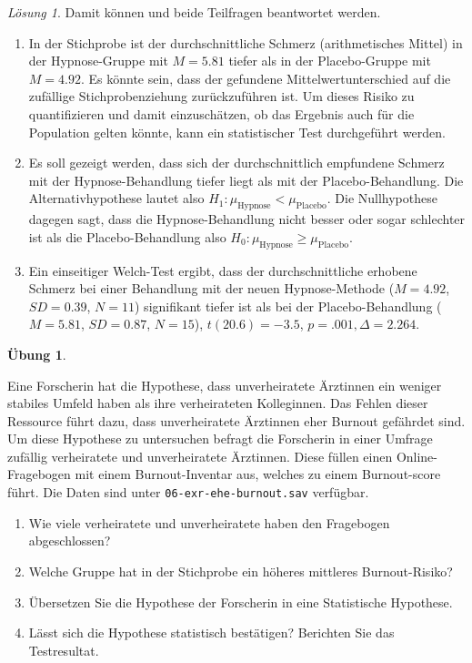 \documentclass[
]{book}
\providecommand{\tightlist}{%
  \setlength{\itemsep}{0pt}\setlength{\parskip}{0pt}}
\theoremstyle{definition}
\theoremstyle{definition}
\theoremstyle{definition}
\newtheorem{exercise}{Übung}[chapter]
\theoremstyle{definition}
\theoremstyle{remark}
\newtheorem*{solution}{Lösung}
\begin{document}
\begin{solution}
Damit können und beide Teilfragen beantwortet werden.

\begin{enumerate}
\def\labelenumi{\alph{enumi})}
\tightlist
\item
  In der Stichprobe ist der durchschnittliche Schmerz (arithmetisches Mittel) in der Hypnose-Gruppe mit \(M = 5.81\) tiefer als in der Placebo-Gruppe mit \(M = 4.92\). Es könnte sein, dass der gefundene Mittelwertunterschied auf die zufällige Stichprobenziehung zurückzuführen ist. Um dieses Risiko zu quantifizieren und damit einzuschätzen, ob das Ergebnis auch für die Population gelten könnte, kann ein statistischer Test durchgeführt werden.
\item
  Es soll gezeigt werden, dass sich der durchschnittlich empfundene Schmerz mit der Hypnose-Behandlung tiefer liegt als mit der Placebo-Behandlung. Die Alternativhypothese lautet also \(H_1: \mu_\text{Hypnose} < \mu_\text{Placebo}\). Die Nullhypothese dagegen sagt, dass die Hypnose-Behandlung nicht besser oder sogar schlechter ist als die Placebo-Behandlung also \(H_0: \mu_\text{Hypnose} \geq \mu_\text{Placebo}\).
\item
  Ein einseitiger Welch-Test ergibt, dass der durchschnittliche erhobene Schmerz bei einer Behandlung mit der neuen Hypnose-Methode (\(M = 4.92\), \(SD = 0.39\), \(N = 11\)) signifikant tiefer ist als bei der Placebo-Behandlung (\(M = 5.81\), \(SD = 0.87\), \(N = 15\)), \(t(20.6) = -3.5\), \(p = .001, \Delta = 2.264\).
\end{enumerate}

\end{solution}

\begin{exercise}
\protect\hypertarget{exr:ehe-burnout}{}\label{exr:ehe-burnout}\leavevmode

Eine Forscherin hat die Hypothese, dass unverheiratete Ärztinnen ein weniger stabiles Umfeld haben als ihre verheirateten Kolleginnen. Das Fehlen dieser Ressource führt dazu, dass unverheiratete Ärztinnen eher Burnout gefährdet sind. Um diese Hypothese zu untersuchen befragt die Forscherin in einer Umfrage zufällig verheiratete und unverheiratete Ärztinnen. Diese füllen einen Online-Fragebogen mit einem Burnout-Inventar aus, welches zu einem Burnout-score führt. Die Daten sind unter \texttt{06-exr-ehe-burnout.sav} verfügbar.

\begin{enumerate}
\def\labelenumi{\alph{enumi})}
\tightlist
\item
  Wie viele verheiratete und unverheiratete haben den Fragebogen abgeschlossen?
\item
  Welche Gruppe hat in der Stichprobe ein höheres mittleres Burnout-Risiko?
\item
  Übersetzen Sie die Hypothese der Forscherin in eine Statistische Hypothese.
\item
  Lässt sich die Hypothese statistisch bestätigen? Berichten Sie das Testresultat.
\end{enumerate}

\end{exercise}
\end{document}
